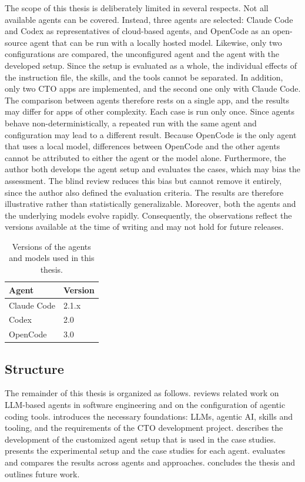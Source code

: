 The scope of this thesis is deliberately limited in several respects. Not all available agents can be covered. Instead, three agents are selected: Claude Code and Codex as representatives of cloud-based agents, and OpenCode as an open-source agent that can be run with a locally hosted model. Likewise, only two configurations are compared, the unconfigured agent and the agent with the developed setup. Since the setup is evaluated as a whole, the individual effects of the instruction file, the skills, and the tools cannot be separated. In addition, only two \ac{CTO} apps are implemented, and the second one only with Claude Code. The comparison between agents therefore rests on a single app, and the results may differ for apps of other complexity. Each case is run only once. Since agents behave non-deterministically, a repeated run with the same agent and configuration may lead to a different result. Because OpenCode is the only agent that uses a local model, differences between OpenCode and the other agents cannot be attributed to either the agent or the model alone. Furthermore, the author both develops the agent setup and evaluates the cases, which may bias the assessment. The blind review reduces this bias but cannot remove it entirely, since the author also defined the evaluation criteria. The results are therefore illustrative rather than statistically generalizable. Moreover, both the agents and the underlying models evolve rapidly. Consequently, the observations reflect the versions available at the time of writing and may not hold for future releases.

\begin{table}
\centering
	\begin{tabular}{ll}
	\toprule
	Agent & Version \\
	\midrule
	Claude Code & 2.1.x \\
	Codex & 2.0 \\
	OpenCode & 3.0 \\
	\bottomrule
	\end{tabular}
	\caption{Versions of the agents and models used in this thesis.}
	\label{tab:agent-versions}
\end{table}

\subsection{Structure}
\label{sec:structure}

The remainder of this thesis is organized as follows.  reviews related work on \ac{LLM}-based agents in software engineering and on the configuration of agentic coding tools.  introduces the necessary foundations: \aclp{LLM}, agentic \ac{AI}, skills and tooling, and the requirements of the \ac{CTO} development project.  describes the development of the customized agent setup that is used in the case studies.  presents the experimental setup and the case studies for each agent.  evaluates and compares the results across agents and approaches.  concludes the thesis and outlines future work.
